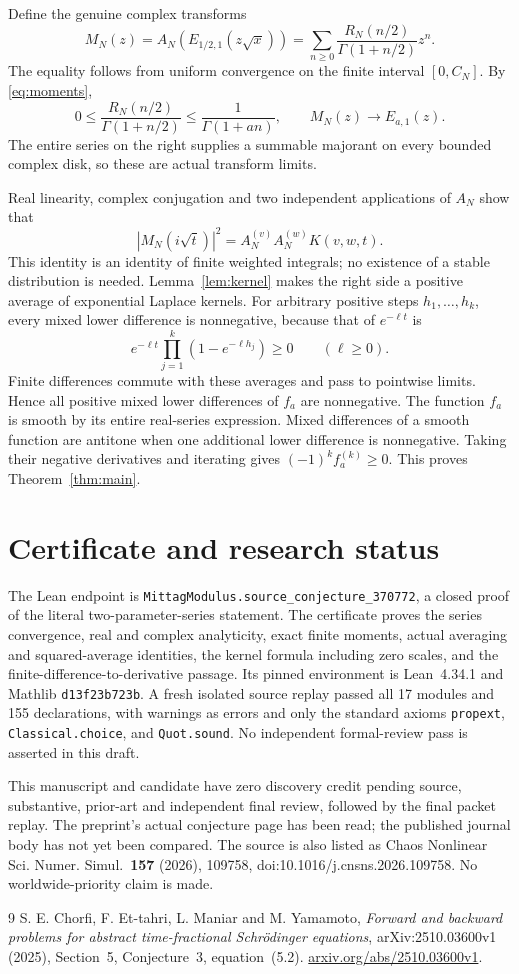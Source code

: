 \documentclass[11pt]{article}
\begin{document}
Define the genuine complex transforms
\[
 M_N(z)=A_N\!\left(E_{1/2,1}(z\sqrt x)\right)
 =\sum_{n\geq0}\frac{R_N(n/2)}{\Gamma(1+n/2)}z^n.
\]
The equality follows from uniform convergence on the finite interval
$[0,C_N]$. By \eqref{eq:moments},
\[
 0\leq\frac{R_N(n/2)}{\Gamma(1+n/2)}
 \leq\frac1{\Gamma(1+an)},\qquad M_N(z)\longrightarrow E_{a,1}(z).
\]
The entire series on the right supplies a summable majorant on every
bounded complex disk, so these are actual transform limits.

Real linearity, complex conjugation and two independent applications of
$A_N$ show that
\[
 |M_N(i\sqrt t)|^2=A_N^{(v)}A_N^{(w)}K(v,w,t).
\]
This identity is an identity of finite weighted integrals; no existence
of a stable distribution is needed. Lemma~\ref{lem:kernel} makes the
right side a positive average of exponential Laplace kernels. For arbitrary
positive steps $h_1,\ldots,h_k$, every mixed lower difference is nonnegative,
because that of $e^{-\ell t}$ is
\[
 e^{-\ell t}\prod_{j=1}^k(1-e^{-\ell h_j})\geq0\qquad(\ell\geq0).
\]
Finite differences commute with these averages and pass to pointwise
limits. Hence all positive mixed lower differences of $f_a$ are nonnegative.
The function $f_a$ is smooth by its entire real-series expression. Mixed
differences of a smooth function are antitone when one additional lower
difference is nonnegative. Taking their negative derivatives and iterating
gives $(-1)^k f_a^{(k)}\geq0$. This proves Theorem~\ref{thm:main}.

\section{Certificate and research status}
The Lean endpoint is \texttt{MittagModulus.source\_conjecture\_370772}, a
closed proof of the literal two-parameter-series statement. The certificate
proves the series convergence, real and complex analyticity, exact finite
moments, actual averaging and squared-average identities, the kernel
formula including zero scales, and the finite-difference-to-derivative
passage. Its pinned environment is Lean~4.34.1 and Mathlib
\texttt{d13f23b723b}. A fresh isolated source replay passed all 17 modules and 155 declarations,
with warnings as errors and only the standard axioms \texttt{propext},
\texttt{Classical.choice}, and \texttt{Quot.sound}. No independent
formal-review pass is asserted in this draft.

This manuscript and candidate have zero discovery credit pending source,
substantive, prior-art and independent final review, followed by the final
packet replay. The preprint's actual conjecture page has been read; the
published journal body has not yet been compared. The source is also listed
as Chaos Nonlinear Sci. Numer. Simul.\ \textbf{157} (2026), 109758,
doi:10.1016/j.cnsns.2026.109758. No worldwide-priority claim is made.

\begin{thebibliography}{9}
 S. E. Chorfi, F. Et-tahri, L. Maniar and M. Yamamoto,
\emph{Forward and backward problems for abstract time-fractional
Schr\"odinger equations}, arXiv:2510.03600v1 (2025),
Section~5, Conjecture~3, equation~(5.2).
\href{https://arxiv.org/abs/2510.03600v1}{arxiv.org/abs/2510.03600v1}.
\end{thebibliography}
\end{document}
